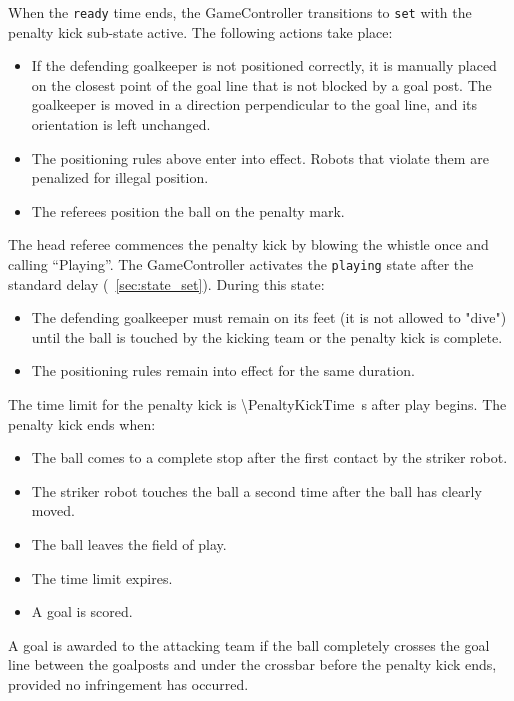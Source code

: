 When the \texttt{ready} time ends, the GameController transitions to \texttt{set} with the penalty kick sub-state active. The following actions take place:

\begin{itemize}
  \item If the defending goalkeeper is not positioned correctly, it is manually placed on the closest point of the goal line that is not blocked by a goal post. The goalkeeper is moved in a direction perpendicular to the goal line, and its orientation is left unchanged.
  \item The positioning rules above enter into effect. Robots that violate them are penalized for illegal position.
  \item The referees position the ball on the penalty mark.
\end{itemize}

The head referee commences the penalty kick by blowing the whistle once and calling ``Playing''. The GameController activates the \texttt{playing} state after the standard delay (\cf~\cref{sec:state_set}). During this state:

\begin{itemize}
  \item The defending goalkeeper must remain on its feet (it is not allowed to "dive") until the ball is touched by the kicking team or the penalty kick is complete.
  \item The positioning rules remain into effect for the same duration.
\end{itemize}

The time limit for the penalty kick is \qty{\PenaltyKickTime}{\second} after play begins. The penalty kick ends when:
\begin{itemize}
  \item The ball comes to a complete stop after the first contact by the striker robot.
  \item The striker robot touches the ball a second time after the ball has clearly moved.
  \item The ball leaves the field of play.
  \item The time limit expires.
  \item A goal is scored.
\end{itemize}

A goal is awarded to the attacking team if the ball completely crosses the goal line between the goalposts and under the crossbar before the penalty kick ends, provided no infringement has occurred.

